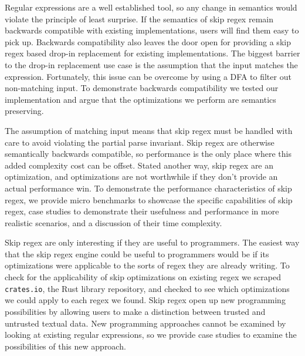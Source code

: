 Regular expressions are a well established tool, so any change in
semantics would violate the principle of least surprise.
If the semantics of skip regex remain backwards compatible with
existing implementations, users will find them easy to pick up.
Backwards compatibility also leaves the door open for providing
a skip regex based drop-in replacement for existing implementations.
The biggest barrier to the drop-in replacement use case is the
assumption that the input matches the expression. Fortunately,
this issue can be overcome by using a DFA to filter out non-matching
input. To demonstrate backwards compatibility we tested our implementation
and argue that the optimizations we perform are semantics preserving.

The assumption of matching input means that skip regex must be 
handled with care to avoid violating the partial parse invariant.
Skip regex are otherwise semantically backwards compatible, so
performance is the only place where this added complexity cost can be
offset. Stated another way, skip regex are an optimization,
and optimizations are not worthwhile if they don't provide an
actual performance win. To demonstrate the performance characteristics
of skip regex, we provide micro benchmarks to showcase the specific
capabilities of skip regex, case studies to demonstrate their
usefulness and performance in more realistic scenarios, and a
discussion of their time complexity.

Skip regex are only interesting if they are useful to programmers.
The easiest way that the skip regex engine could be useful to programmers
would be if its optimizations were applicable to the sorts of regex they
are already writing. To check for the applicability of skip optimizations
on existing regex we scraped \verb'crates.io',
the Rust library repository, and checked to see which optimizations
we could apply to each regex we found. Skip regex open up new programming
possibilities by allowing users to make a distinction between trusted
and untrusted textual data. New programming approaches cannot be 
examined by looking at existing regular expressions, so we provide
case studies to examine the possibilities of this new approach.


